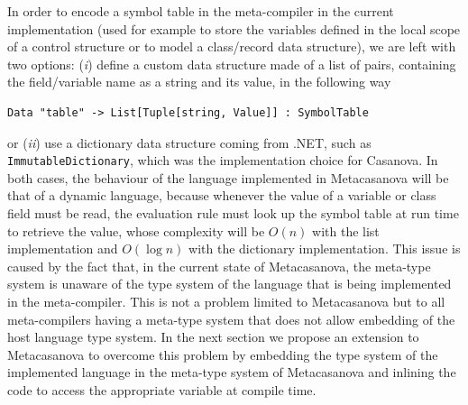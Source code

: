 In order to encode a symbol table in the meta-compiler in the current implementation (used for example to store the variables defined in the local scope of a control structure or to model a class/record data structure), we are left with two options: (\textit{i}) define a custom data structure made of a list of pairs, containing the field/variable name as a string and its value, in the following way

\begin{lstlisting}
Data "table" -> List[Tuple[string, Value]] : SymbolTable
\end{lstlisting}

\noindent
or (\textit{ii}) use a dictionary data structure coming from .NET, such as \texttt{ImmutableDictionary}, which was the implementation choice for Casanova. In both cases, the behaviour of the language implemented in Metacasanova will be that of a dynamic language, because whenever the value of a variable or class field must be read, the evaluation rule must look up the symbol table at run time to retrieve the value, whose complexity will be $O(n)$ with the list implementation and $O(\log n)$ with the dictionary implementation. This issue is caused by the fact that, in the current state of Metacasanova, the meta-type system is unaware of the type system of the language that is being implemented in the meta-compiler. This is not a problem limited to Metacasanova but to all meta-compilers having a meta-type system that does not allow embedding of the host language type system. In the next section we propose an extension to Metacasanova to overcome this problem by embedding the type system of the implemented language in the meta-type system of Metacasanova and inlining the code to access the appropriate variable at compile time.